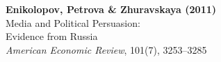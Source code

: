\documentclass[12pt]{article}
\begin{document}
\begin{center}
{\Large\bfseries Enikolopov, Petrova \& Zhuravskaya (2011)}\\
{\large Media and Political Persuasion:}\\
{\large Evidence from Russia}\\
\vspace{0.5em}
{\normalsize \textit{American Economic Review}, 101(7), 3253--3285}
\end{center}

\vspace{1em}




\end{document}
